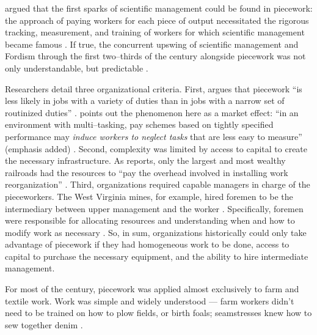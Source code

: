 \documentclass[trackingWork]{subfiles}
\begin{document}
\citeauthor{10.2307/23702539} argued that the first sparks of scientific management
could be found in piecework:
the approach of paying workers for each piece of output necessitated
the rigorous tracking, measurement, and training of workers
for which scientific management became famous
\cite{10.2307/23702539}.
If true, 
the concurrent upswing of
scientific management and Fordism
through the first two--thirds of the  century
alongside piecework was not only understandable, but predictable
\cite{hart2013rise}.

Researchers detail three organizational criteria.
First, \citeauthor{Brown01041990} argues that
piecework ``is less likely in jobs with a variety of duties than in
jobs with a narrow set of routinized duties''
\cite{Brown01041990}.
\citeauthor{SJOE:SJOE371} points out the phenomenon here as a market effect:
``in an environment with multi--tasking,
pay schemes based on tightly specified performance may
\textit{induce workers to neglect tasks} that are less easy to measure''
(emphasis added) \cite{SJOE:SJOE371}.
Second,
complexity was limited by access to capital to create the necessary infrastructure.
As \citeauthor{10.2307/23702539} reports,
only the largest and most wealthy railroads had the resources
to ``pay the overhead involved in installing work reorganization''
\cite{10.2307/23702539}.
Third, organizations required capable managers in charge of the pieceworkers.
The West Virginia mines, for example, hired foremen 
to be the intermediary between upper management and the worker
\cite{10.2307/2118435}.
Specifically, foremen were responsible for allocating resources and
understanding when and how to modify work as necessary
\cite{wray1949marginal}.
So, in sum,
organizations historically could only take advantage of piecework if they had
homogeneous work to be done,
access to capital to purchase the necessary equipment, and
the ability to hire intermediate management.

For most of the  century,
piecework was applied almost exclusively to farm and textile work.
Work was simple and widely understood
--- farm workers didn't need to be trained on how to plow fields, or birth foals;
seamstresses knew how to sew together denim
\cite{10.2307/2338394,riisOtherSideLives}.
\end{document}
